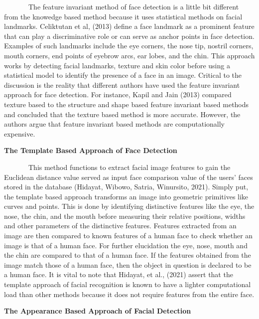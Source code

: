 \documentclass[
  12pt,
]{report}
\begin{document}
~~~~~~~The feature invariant method of face detection is a little bit
different from the knowedge based method because it uses statistical
methods on facial landmarks. Celiktutan et al, (2013) define a face
landmark as a prominent feature that can play a discriminative role or
can serve as anchor points in face detection. Examples of such landmarks
include the eye corners, the nose tip, nostril corners, mouth corners,
end points of eyebrow arcs, ear lobes, and the chin. This approach works
by detecting facial landmarks, texture and skin color before using a
statistical model to identify the presence of a face in an image.
Critical to the discussion is the reality that different authors have
used the feature invariant approach for face detection. For instance,
Kapil and Jain (2013) compared texture based to the structure and shape
based feature invariant based methods and concluded that the texture
based method is more accurate. However, the authors argue that feature
invariant based methods are computationally expensive.

\textbf{The Template Based Approach of Face Detection}\\
\vspace{-1.2em}

~~~~~~~This method functions to extract facial image features to gain
the Euclidean distance value served as input face comparison value of
the users' faces stored in the database (Hidayat, Wibowo, Satria,
Winursito, 2021). Simply put, the template based approach transforms an
image into geometric primitives like curves and points. This is done by
identifying distinctive features like the eye, the nose, the chin, and
the mouth before measuring their relative positions, widths and other
parameters of the distinctive features. Features extracted from an image
are then compared to known features of a human face to check whether an
image is that of a human face. For further elucidation the eye, nose,
mouth and the chin are compared to that of a human face. If the features
obtained from the image match those of a human face, then the object in
question is declared to be a human face. It is vital to note that
Hidayat, et al., (2021) assert that the template approach of facial
recognition is known to have a lighter computational load than other
methods because it does not require features from the entire face.

\textbf{The Appearance Based Approach of Facial Detection}\\
\vspace{-1.2em}
\end{document}
